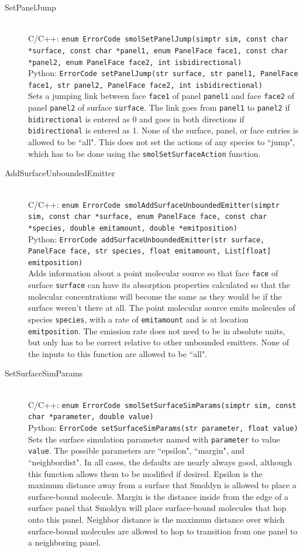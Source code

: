 \documentclass {scrbook}
\newcommand {\ttt} {\texttt}
\begin{document}
\begin{description}
\item[SetPanelJump]
\hfill \\
C/C++: \ttt{enum ErrorCode smolSetPanelJump(simptr sim, const char *surface, const char *panel1, enum PanelFace face1, const char *panel2, enum PanelFace face2, int isbidirectional)}\\
Python: \ttt{ErrorCode setPanelJump(str surface, str panel1, PanelFace face1, str panel2, PanelFace face2, int isbidirectional)}\\
Sets a jumping link between face \ttt{face1} of panel \ttt{panel1} and face \ttt{face2} of panel \ttt{panel2} of surface \ttt{surface}. The link goes from \ttt{panel1} to \ttt{panel2} if \ttt{bidirectional} is entered as 0 and goes in both directions if \ttt{bidirectional} is entered as 1. None of the surface, panel, or face entries is allowed to be ``all". This does not set the actions of any species to ``jump", which has to be done using the \ttt{smolSetSurfaceAction} function.

\item[AddSurfaceUnboundedEmitter]
\hfill \\
C/C++: \ttt{enum ErrorCode smolAddSurfaceUnboundedEmitter(simptr sim, const char *surface, enum PanelFace face, const char *species, double emitamount, double *emitposition)}\\
Python: \ttt{ErrorCode addSurfaceUnboundedEmitter(str surface, PanelFace face, str species, float emitamount, List[float] emitposition)}\\
Adds information about a point molecular source so that face \ttt{face} of surface \ttt{surface} can have its absorption properties calculated so that the molecular concentrations will become the same as they would be if the surface weren't there at all. The point molecular source emits molecules of species \ttt{species}, with a rate of \ttt{emitamount} and is at location \ttt{emitposition}. The emission rate does not need to be in absolute units, but only has to be correct relative to other unbounded emitters. None of the inputs to this function are allowed to be ``all".

\item[SetSurfaceSimParams]
\hfill \\
C/C++: \ttt{enum ErrorCode smolSetSurfaceSimParams(simptr sim, const char *parameter, double value)}\\
Python: \ttt{ErrorCode setSurfaceSimParams(str parameter, float value)}\\
Sets the surface simulation parameter named with \ttt{parameter} to value \ttt{value}. The possible parameters are ``epsilon", ``margin", and ``neighbordist". In all cases, the defaults are nearly always good, although this function allows them to be modified if desired. Epsilon is the maximum distance away from a surface that Smoldyn is allowed to place a surface-bound molecule. Margin is the distance inside from the edge of a surface panel that Smoldyn will place surface-bound molecules that hop onto this panel. Neighbor distance is the maximum distance over which surface-bound molecules are allowed to hop to transition from one panel to a neighboring panel.


\end{description}
\end{document}
